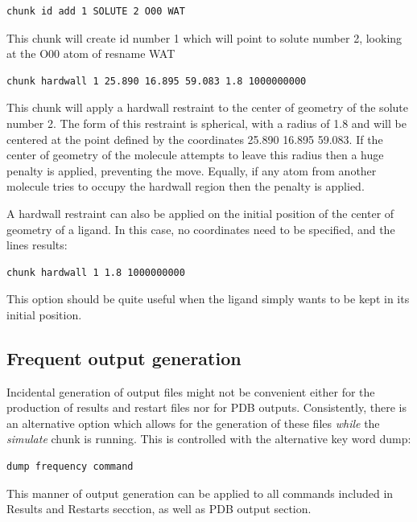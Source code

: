 \documentclass[letterpaper,10pt,english]{manual}
\begin{document}
\begin{Verbatim}[commandchars=@\[\]]
chunk id add 1 SOLUTE 2 O00 WAT
\end{Verbatim}

This chunk will create id number 1 which will point to solute number 2, looking at the O00 atom of resname WAT

\begin{Verbatim}[commandchars=@\[\]]
chunk hardwall 1 25.890 16.895 59.083 1.8 1000000000
\end{Verbatim}

This chunk will apply a hardwall restraint to the center of geometry of the solute number 2. The form of this restraint is spherical, with a radius of 1.8 and will be centered at the point defined by the coordinates 25.890 16.895 59.083. If the center of geometry of the molecule attempts to leave this radius then a huge penalty is applied, preventing the move. Equally, if any atom from another molecule tries to occupy the hardwall region then the penalty is applied.

A hardwall restraint can also be applied on the initial position of the center of geometry of a ligand. In this case, no coordinates need to be specified, and the lines results:

\begin{Verbatim}[commandchars=@\[\]]
chunk hardwall 1 1.8 1000000000
\end{Verbatim}

This option should be quite useful when the ligand simply wants to be kept in its initial position.


\subsection{Frequent output generation}

Incidental generation of output files might not be convenient either for the production of results and restart files nor for PDB outputs. Consistently, there is an alternative option which allows for the generation of these files \emph{while} the \emph{simulate} chunk is running.
This is controlled with the alternative key word dump:

\begin{Verbatim}[commandchars=@\[\]]
dump frequency command
\end{Verbatim}

This manner of output generation can be applied to all commands included in Results and Restarts secction, as well as PDB output section.
\end{document}

